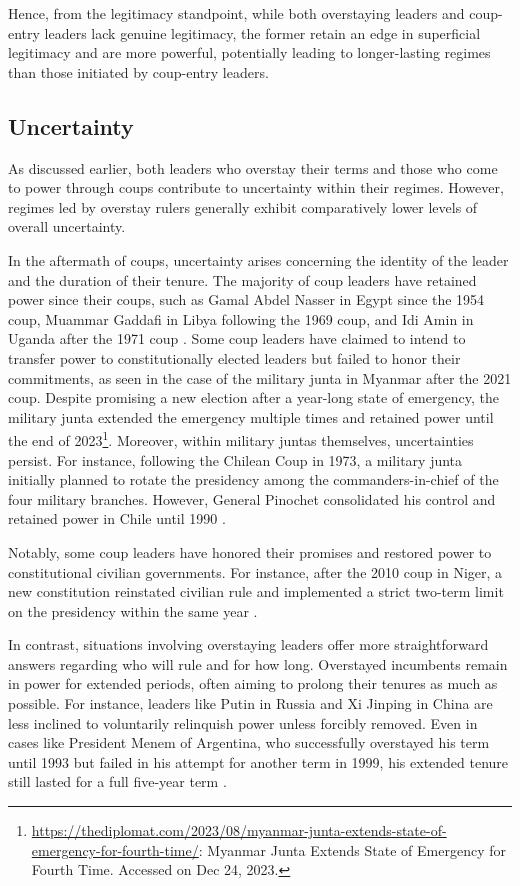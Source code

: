 \documentclass[
  12pt,
  a4paper,
  12pt]{article}
\begin{document}
Hence, from the legitimacy standpoint, while both overstaying leaders
and coup-entry leaders lack genuine legitimacy, the former retain an
edge in superficial legitimacy and are more powerful, potentially
leading to longer-lasting regimes than those initiated by coup-entry
leaders.

\subsection{Uncertainty}\label{uncertainty}

As discussed earlier, both leaders who overstay their terms and those
who come to power through coups contribute to uncertainty within their
regimes. However, regimes led by overstay rulers generally exhibit
comparatively lower levels of overall uncertainty.

In the aftermath of coups, uncertainty arises concerning the identity of
the leader and the duration of their tenure. The majority of coup
leaders have retained power since their coups, such as Gamal Abdel
Nasser in Egypt since the 1954 coup, Muammar Gaddafi in Libya following
the 1969 coup, and Idi Amin in Uganda after the 1971 coup
\citep{geddes2018}. Some coup leaders have claimed to intend to transfer
power to constitutionally elected leaders but failed to honor their
commitments, as seen in the case of the military junta in Myanmar after
the 2021 coup. Despite promising a new election after a year-long state
of emergency, the military junta extended the emergency multiple times
and retained power until the end of 2023\footnote{\url{https://thediplomat.com/2023/08/myanmar-junta-extends-state-of-emergency-for-fourth-time/}:
  Myanmar Junta Extends State of Emergency for Fourth Time. Accessed on
  Dec 24, 2023.}. Moreover, within military juntas themselves,
uncertainties persist. For instance, following the Chilean Coup in 1973,
a military junta initially planned to rotate the presidency among the
commanders-in-chief of the four military branches. However, General
Pinochet consolidated his control and retained power in Chile until 1990
\citep{svolik2012}.

Notably, some coup leaders have honored their promises and restored
power to constitutional civilian governments. For instance, after the
2010 coup in Niger, a new constitution reinstated civilian rule and
implemented a strict two-term limit on the presidency within the same
year \citep{ginsburg2019}.

In contrast, situations involving overstaying leaders offer more
straightforward answers regarding who will rule and for how long.
Overstayed incumbents remain in power for extended periods, often aiming
to prolong their tenures as much as possible. For instance, leaders like
Putin in Russia and Xi Jinping in China are less inclined to voluntarily
relinquish power unless forcibly removed. Even in cases like President
Menem of Argentina, who successfully overstayed his term until 1993 but
failed in his attempt for another term in 1999, his extended tenure
still lasted for a full five-year term \citep{llanos2019}.
\end{document}
